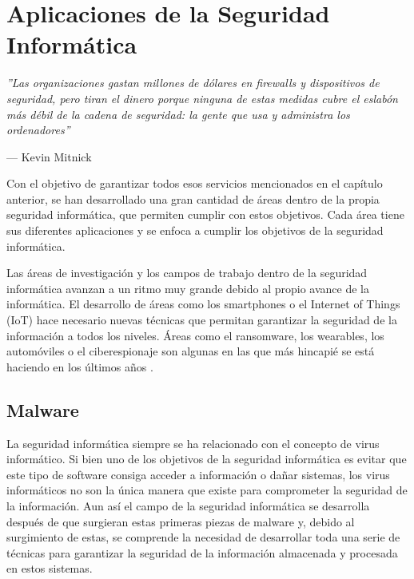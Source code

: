 \chapter[Aplicaciones]{Aplicaciones de la Seguridad Informática}

\epigraph{\textit{''Las organizaciones gastan millones de dólares en firewalls y dispositivos de seguridad, pero tiran el dinero porque ninguna de estas medidas cubre el eslabón más débil de la cadena de seguridad: la gente que usa y administra los ordenadores''}}{--- Kevin Mitnick}

Con el objetivo de garantizar todos esos servicios mencionados en el capítulo anterior, se han desarrollado una gran cantidad de áreas dentro de la propia seguridad informática, que permiten cumplir con estos objetivos. Cada área tiene sus diferentes aplicaciones y se enfoca a cumplir los objetivos de la seguridad informática.

Las áreas de investigación y los campos de trabajo dentro de la seguridad informática avanzan a un ritmo muy grande debido al propio avance de la informática. El desarrollo de áreas como los smartphones o el Internet of Things (IoT) hace necesario nuevas  técnicas que permitan garantizar la seguridad de la información a todos los niveles. Áreas como el ransomware, los wearables, los automóviles o el ciberespionaje son algunas en las que más hincapié se está haciendo en los últimos años \cite{mcafee-predictions}.


\section{Malware}

La seguridad informática siempre se ha relacionado con el concepto de virus informático. Si bien uno de los objetivos de la seguridad informática es evitar que este tipo de software consiga acceder a información o dañar sistemas, los virus informáticos no son la única manera que existe para comprometer la seguridad de la información. Aun así el campo de la seguridad informática se desarrolla después de que surgieran estas primeras piezas de malware y, debido al surgimiento de estas, se comprende la necesidad de desarrollar toda una serie de técnicas para garantizar la seguridad de la información almacenada y procesada en estos sistemas.

